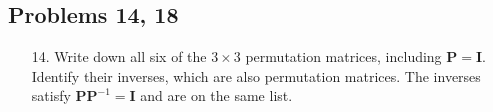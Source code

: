 \begin{itemize}
      \subsection{Problems 14, 18}
      \begin{enumerate}
      \item[14.] Write down all six of the \( 3\times 3 \) permutation matrices,
        including \(\bm{P} = \bm{I}\). Identify their inverses, which are also
        permutation matrices. The inverses satisfy \(\bm{PP}^{-1} = \bm{I}\)
        and are on the same list.
\end{enumerate}
\end{itemize}
